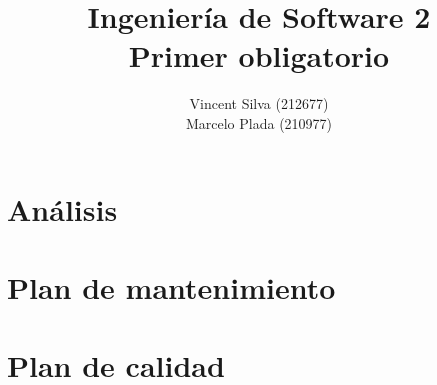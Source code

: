 

%

\title{Ingeniería de Software 2\\Primer obligatorio}
\author{Vincent Silva (212677) \\Marcelo Plada (210977) \\}




\maketitle

\tableofcontents

\chapter{Análisis}





\newpage


\newpage





\newpage
\chapter{Plan de mantenimiento}
    
    \newpage
    
    \newpage
    
    \newpage
    
    \newpage
    
    \newpage
    
    \newpage
    
    \newpage
        
    \newpage
        
    \newpage
    
\chapter{Plan de calidad}
    


